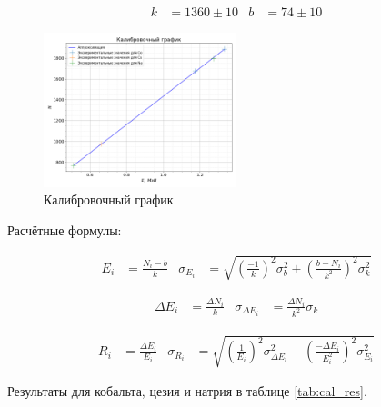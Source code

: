 \documentclass[a4paper, 12pt]{article}
\begin{document}
            \begin{align*}
                k &= 1360 \pm 10 & b &= 74 \pm 10
            \end{align*}

            \begin{figure}[ht!]
                \begin{center}
                    \includegraphics[width = 0.5\textwidth]{img/calibration.png}
                    \caption{Калибровочный график}
                    \label{plot:calibration}
                \end{center}
            \end{figure}

            Расчётные формулы:

            \begin{align*}
                E_i &= \frac{N_i - b}{k} & \sigma_{E_i} &= \sqrt{\left( \frac{-1}{k} \right)^2 \sigma_b^2 + \left( \frac{b - N_i}{k^2} \right)^2 \sigma_k^2}
            \end{align*}

            \begin{align*}
                \Delta E_i &= \frac{\Delta N_i}{k} & \sigma_{\Delta E_i} &= \frac{\Delta N_i}{k^2} \sigma_k
            \end{align*}

            \begin{align*}
                R_i &= \frac{\Delta E_i}{E_i} & \sigma_{R_i} &= \sqrt{\left( \frac{1}{E_i} \right)^2 \sigma_{\Delta E_i}^2 + \left( \frac{-\Delta E_i}{E_i^2} \right)^2 \sigma_{E_i}^2}
            \end{align*}

            Результаты для кобальта, цезия и натрия в таблице \ref{tab:cal_res}.
\end{document}
